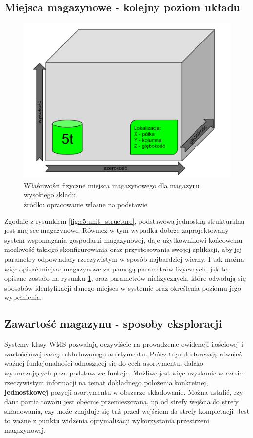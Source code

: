 	\subsection{Miejsca magazynowe - kolejny poziom układu}
		\begin{figure}[h]
			\centering
			\includegraphics[width=\textwidth]{images/storage_unit_description}
			\caption[Miejsce magazynowe - właściwości fizyczne]{
					Właściwości fizyczne miejsca magazynowego dla magazynu wysokiego składu \\
					źródło: opracowanie własne na podstawie \cite{IDL}
			}
			\label{fig:c5:storage_unit_description}
		\end{figure}
		Zgodnie z rysunkiem \ref{fig:c5:unit_structure}, podstawową jednostką strukturalną jest miejsce magazynowe.
		Również w tym wypadku dobrze zaprojektowany system wspomagania gospodarki magazynowej, daje 
		użytkownikowi końcowemu możliwość takiego skonfigurowania oraz przystosowania swojej aplikacji,
		aby jej parametry odpowiadały rzeczywistym w sposób najbardziej wierny. I tak można więc opisać miejsce 
		magazynowe za pomogą parametrów fizycznych, jak to opisane zostało na rysunku \ref{fig:c5:storage_unit_description},
		oraz parametrów niefizycznych, które odwołują się sposobów identyfikacji danego miejsca 
		w systemie oraz określenia poziomu jego wypełnienia. 
	\subsection{Zawartość magazynu - sposoby eksploracji}
		Systemy klasy WMS pozwalają oczywiście na prowadzenie ewidencji ilościowej i wartościowej całego
		składowanego asortymentu. Prócz tego dostarczają również ważnej funkcjonalności odnoszącej się do cech asortymentu,
		daleko wykraczających poza podstawowe funkcje. Możliwe jest więc uzyskanie w czasie rzeczywistym informacji na temat
		dokładnego położenia konkretnej, \textbf{jednostkowej} pozycji asortymentu w obszarze składowanie. Można 
		ustalić, czy dana partia towaru jest obecnie przemieszczana, np od strefy wejścia do strefy składowania, czy może
		znajduje się tuż przed wejściem do strefy kompletacji. Jest to ważne z punktu widzenia optymalizacji
		wykorzystania przestrzeni magazynowej. \\
		
